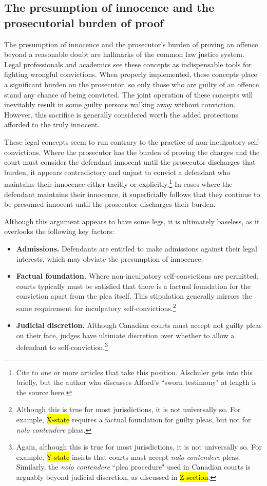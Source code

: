 \subsection{The presumption of innocence and the prosecutorial burden of proof}

The presumption of innocence and the prosecutor's burden of proving an offence beyond a reasonable doubt are hallmarks of the common law justice system. Legal professionals and academics see these concepts as indispensable tools for fighting wrongful convictions. When properly implemented, these concepts place a significant burden on the prosecutor, so only those who are guilty of an offence stand any chance of being convicted. The joint operation of these concepts will inevitably result in some guilty persons walking away without conviction. However, this sacrifice is generally considered worth the added protections afforded to the truly innocent. 

These legal concepts seem to run contrary to the practice of non-inculpatory self-convictions. Where the prosecutor has the burden of proving the charges and the court must consider the defendant innocent until the prosecutor discharges that burden, it appears contradictory and unjust to convict a defendant who maintains their innocence either tacitly or explicitly.\footnote{Cite to one or more articles that take this position. Alschuler gets into this briefly, but the author who discusses Alford's ``sworn testimony" at length is the source here.} In cases where the defendant maintains their innocence, it superficially follows that they continue to be presumed innocent until the prosecutor discharges their burden. 

Although this argument appears to have some legs, it is ultimately baseless, as it overlooks the following key factors:

\begin{itemize}
    \item \textbf{Admissions.} Defendants are entitled to make admissions against their legal interests, which may obviate the presumption of innocence.
    \item \textbf{Factual foundation.} Where non-inculpatory self-convictions are permitted, courts typically must be satisfied that there is a factual foundation for the conviction apart from the plea itself. This stipulation generally mirrors the same requirement for inculpatory self-convictions.\footnote{Although this is true for most jurisdictions, it is not universally so. For example, \hl{X-state} requires a factual foundation for guilty pleas, but not for \textit{nolo contendere} pleas.} 
    \item \textbf{Judicial discretion.} Although Canadian courts must accept not guilty pleas on their face, judges have ultimate discretion over whether to allow a defendant to self-conviction.\footnote{Again, although this is true for most jurisdictions, it is not universally so. For example, \hl{Y-state} insists that courts must accept \textit{nolo contendere} pleas. Similarly, the \textit{nolo contendere} ``plea procedure" used in Canadian courts is arguably beyond judicial discretion, as discussed in \hl{Z-section}.}
\end{itemize}

